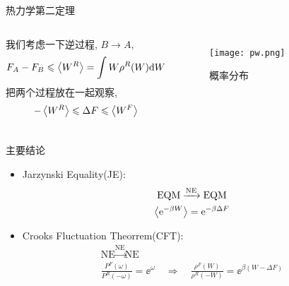     \begin{frame}{热力学第二定理}
        \begin{columns}
            我们考虑一下逆过程, $B\to A$,
            \begin{equation}
                F_A - F_B \leqslant \expval{W^R} = \int W\rho^R(W)\dd W
            \end{equation}
            把两个过程放在一起观察,
            \begin{equation}
                - \expval{W^R} \leqslant \Delta F \leqslant \expval{W^F}
            \end{equation}
            \pause
            \begin{figure}
                \centering
                \texttt{[image: pw.png]}
                \caption{概率分布}
            \end{figure}
        \end{columns}
    \end{frame}
    \begin{frame}{主要结论}
        \begin{itemize}
            \item Jarzynski Equality(JE):
            \begin{equation}
                \begin{gathered}
                    \text{EQM} \xrightarrow{\text{NE}} \text{EQM}\\
                    \expval{\mathrm{e}^{-\beta W}} = \mathrm{e}^{-\beta \Delta F}
                \end{gathered}
            \end{equation}
            \item Crooks Fluctuation Theorrem(CFT):
            \begin{equation}
                \begin{gathered}
                    \text{NE} \xrightarrow{\text{NE}} \text{NE}\\
                    \frac{P^F(\omega)}{P^R(-\omega)} = \ee^{\omega}\quad\Rightarrow\quad \frac{\rho^F(W)}{\rho^R(-W)} = \ee^{\beta(W - \Delta F)}                    
                \end{gathered}
            \end{equation}
        \end{itemize}
    \end{frame}
